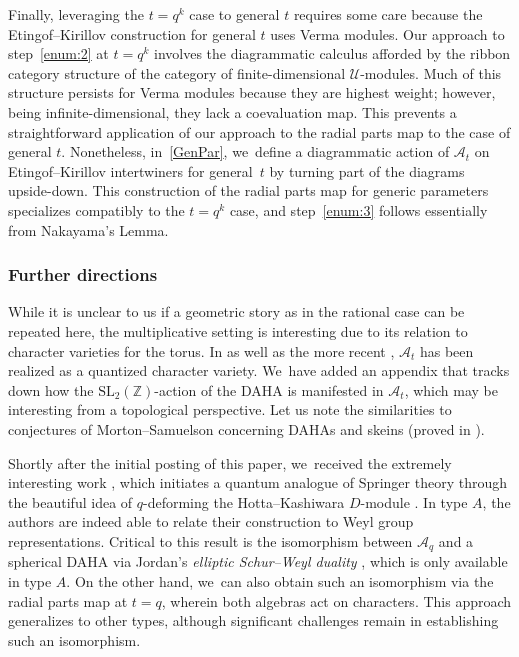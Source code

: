 \documentclass[11pt]{article}
\newcommand{\SL}{\mathrm{SL}}
\theoremstyle{definition}
\newcommand{\ZZ}{\mathbb{Z}}
\newcommand{\UU}{\mathcal{U}}
\newcommand{\AAA}{\mathcal{A}}
\begin{document}
Finally, leveraging the $t=q^k$ case to general $t$ requires some care because the Etingof--Kirillov construction for general $t$ uses Verma modules.
Our approach to step~\eqref{enum:2} at $t=q^k$ involves the diagrammatic calculus afforded by the ribbon category structure of the category of finite-dimensional $\UU$-modules.
Much of this structure persists for Verma modules because they are highest weight; however, being infinite-dimensional, they lack a coevaluation map.
This prevents a straightforward application of our approach to the radial parts map to the case of general $t$.
Nonetheless, in~\ref{GenPar}, we~define a diagrammatic action of $\mathcal{A}_t$ on Etingof--Kirillov intertwiners for general~$t$ by turning part of the diagrams upside-down.
This construction of the radial parts map for generic parameters specializes compatibly to the $t=q^k$ case, and step~\eqref{enum:3} follows essentially from Nakayama's Lemma.

\subsubsection*{Further directions}
While it is unclear to us if a geometric story as in the rational case can be repeated here, the multiplicative setting is interesting due to its relation to character varieties for the torus.
In \cite{AlekScho} as well as the more recent \cite{BBJ1,BBJ2}, $\AAA_t$ has been realized as a quantized character variety. We~have added an appendix that tracks down how the $\SL_2(\ZZ)$-action of the DAHA is manifested in $\AAA_t$, which may be interesting from a topological perspective.
Let us note the similarities to conjectures of Morton--Samuelson \cite{MortSamDAHA} concerning DAHAs and skeins (proved in \cite{BCMN}).

Shortly after the initial posting of this paper, we~received the extremely interesting work \cite{GJV}, which initiates a quantum analogue of Springer theory through the beautiful idea of $q$-deforming the Hotta--Kashiwara $D$-module \cite{HottKash}.
In type $A$, the authors are indeed able to relate their construction to Weyl group representations.
Critical to this result is the isomorphism between $\AAA_q$ and a spherical DAHA via Jordan's \textit{elliptic Schur--Weyl duality} \cite{JordanEll,JorVaz}, which is only available in type $A$.
On the other hand, we~can also obtain such an isomorphism via the radial parts map at $t=q$, wherein both algebras act on characters.
This approach generalizes to other types, although significant challenges remain in establishing such an isomorphism.
\end{document}
